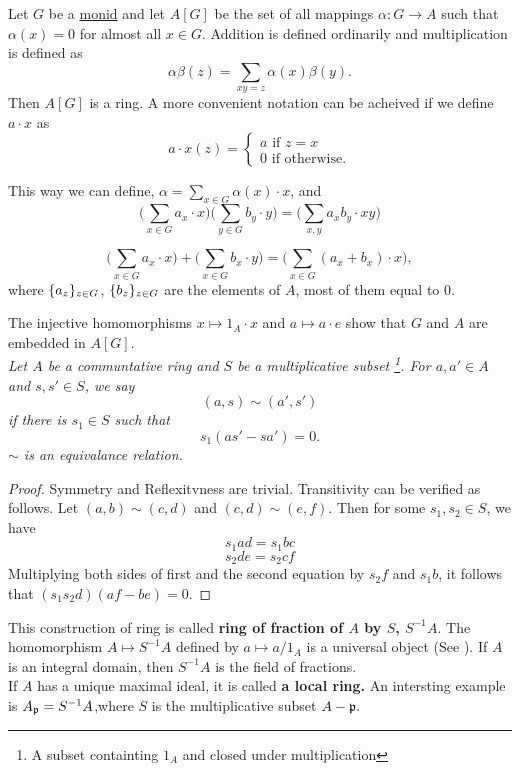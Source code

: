 Let $G$ be a \href{https://en.wikipedia.org/wiki/Monoid}{monid} and let $A[G]$ be the set of all mappings $\alpha: G \to A $ such that $\alpha(x) = 0$ for almost all $x \in G$. Addition is defined ordinarily and multiplication is defined as 
$$\alpha \beta (z) = \sum_{xy = z} \alpha(x) \beta(y).$$
Then $A[G]$ is a ring. A more convenient notation can be acheived if we define $a \cdot x$ as 
$$
    a \cdot x(z) = \begin{cases}
        a \text{ if } z = x\\
        0 \text{ if otherwise.}
\end{cases}$$

This way we can define, 
$\alpha = \sum_{x \in G} \alpha(x) \cdot x$, and 
$$\bigg(\sum_{x \in G} a_x \cdot x \bigg) \bigg(\sum_{y \in G} b_y \cdot y \bigg) = \bigg(\sum_{x, y} a_xb_y \cdot xy \bigg)$$

$$\bigg(\sum_{x \in G} a_x \cdot x \bigg) + \bigg(\sum_{x \in G} b_x \cdot y \bigg) = \bigg(\sum_{x\in G} (a_x + b_x) \cdot x \bigg), $$
where $\{a_z\}_{z \in G}$, $\{b_z\}_{z \in G}$ are the elements of $A$, most of them equal to $0$. 

The injective homomorphisms $x \mapsto 1_A \cdot x$ and $a \mapsto a \cdot e$ show that $G$ and $A$ are embedded in $A[G]$. \\ 


\noindent \textit{Let $A$ be a communtative ring and $S$ be a multiplicative subset \footnote{A subset containting $1_A$ and closed under multiplication}.  For $a, a' \in A$ and $s, s' \in S$, we say}
$$(a, s) \sim (a', s')$$
\textit{if there is $s_1 \in S$ such that}
$$s_1(as' - sa') = 0.$$
\textit{$\sim$ is an equivalance relation.}
\begin{proof}
    Symmetry and Reflexitvness are trivial. Transitivity can be verified as follows. Let $(a, b) \sim (c, d)$ and $(c, d) \sim (e, f)$. Then for some $s_1, s_2 \in S$, we have
    $$s_1ad  = s_1bc$$
    $$s_2de = s_2cf$$
Multiplying both sides of first and the second equation by $s_2f$ and $s_1b$, it follows that $(s_1s_2d)(af - be) = 0.$
\end{proof}
\noindent This construction of ring is called \textbf{ring of fraction of $A$ by $S$, $S^{-1}A$}. The homomorphism $A \mapsto S^{-1}A$ defined by $a \mapsto a/1_A$ is a universal object (See ). If $A$ is an integral domain, then $S^{-1}A$ is the field of fractions.
\\

If $A$ has a unique maximal ideal, it is called \textbf{a local ring.} An intersting example is $A_{\mathfrak{p}} = S^{-1}A$,where $S$ is the multiplicative subset $A - \mathfrak{p}.$

